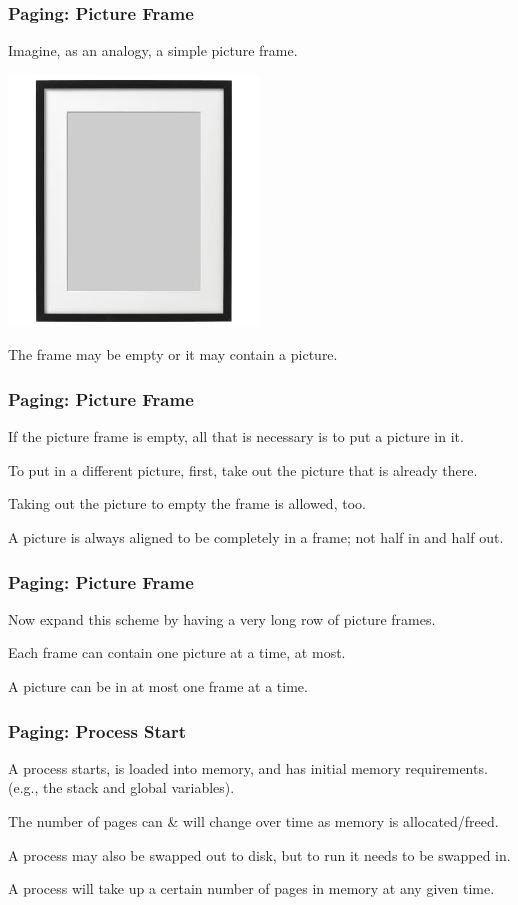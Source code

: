 \begin{frame}
\frametitle{Paging: Picture Frame}

Imagine, as an analogy, a simple picture frame. 

\begin{center}
	\includegraphics[width=0.5\textwidth]{images/pictureframe.jpg}
\end{center}

The frame may be empty or it may contain a picture. 

\end{frame}

\begin{frame}
\frametitle{Paging: Picture Frame}

If the picture frame is empty, all that is necessary is to put a picture in it. 

To put in a different picture, first, take out the picture that is already there. 

Taking out the picture to empty the frame is allowed, too. 

A picture is always aligned to be completely in a frame; not half in and half out. 

\end{frame}

\begin{frame}
\frametitle{Paging: Picture Frame}


Now expand this scheme by having a very long row of picture frames. 

Each frame can contain one picture at a time, at most. 

A picture can be in at most one frame at a time. 

\end{frame}

\begin{frame}
\frametitle{Paging: Process Start}

A process starts, is loaded into memory, and has initial memory requirements. \\
\quad (e.g., the stack and global variables).

The number of pages can \& will change over time as memory is allocated/freed. 

A process may also be swapped out to disk, but to run it needs to be swapped in. 

A process will take up a certain number of pages in memory at any given time.

\end{frame}

